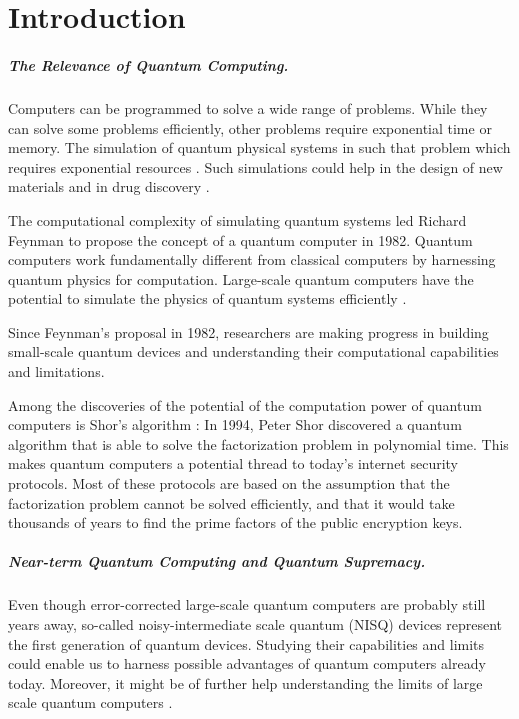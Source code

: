\chapter{Introduction}

\paragraph{The Relevance of Quantum Computing.}
Computers can be programmed to solve a wide range of problems.
While they can solve some problems efficiently, 
other problems require exponential time or memory. The simulation 
of quantum physical systems in such that problem which requires 
exponential resources \cite{nielsen2002quantum}.  
Such simulations could help in the design 
of new materials and in drug discovery \cite{8585034}.

The computational complexity of simulating quantum systems led 
Richard Feynman to propose the concept of a quantum computer \cite{feynman1982simulating} in 1982. 
Quantum computers work fundamentally different from classical computers by 
harnessing quantum physics for computation. Large-scale quantum computers have the potential
to simulate the physics of quantum systems efficiently \cite{Zalka_1998}.

Since Feynman's proposal in 1982, researchers are making progress in building small-scale 
quantum devices and understanding their computational capabilities and limitations.

Among the discoveries of the potential of the computation power of quantum computers is Shor's algorithm \cite{shor1997factorisation}: 
In 1994, Peter Shor discovered a quantum algorithm that is able to solve the 
factorization problem in polynomial time. This makes quantum computers a potential thread to 
today's internet security protocols. Most of these protocols are based on the assumption 
that the factorization problem cannot be solved efficiently, and that it would take thousands of years to find the 
prime factors of the public encryption keys.

\paragraph{Near-term Quantum Computing and Quantum Supremacy.}
Even though error-corrected large-scale quantum computers are probably still 
years away, so-called noisy-intermediate scale 
quantum (NISQ) devices represent the first generation of quantum devices.
Studying their capabilities and limits could enable us to harness possible advantages 
of quantum computers already today. Moreover, it might be of further help understanding
the limits of large scale quantum computers \cite{Preskill_2018}.

